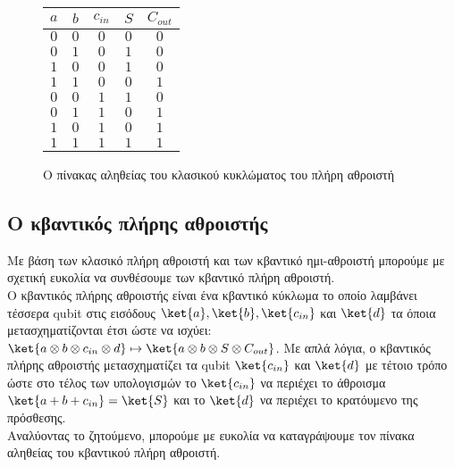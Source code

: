 \begin{figure}[ht]
  \centering
  \begin{tabular}{c c c|c c}
    $a$ & $b$ & $c_{in}$ & $S$ & $C_{out}$ \\
    \hline
    $0$ & $0$ & $0$ & $0$ & $0$ \\
    $0$ & $1$ & $0$ & $1$ & $0$ \\
    $1$ & $0$ & $0$ & $1$ & $0$ \\
    $1$ & $1$ & $0$ & $0$ & $1$ \\
    $0$ & $0$ & $1$ & $1$ & $0$ \\
    $0$ & $1$ & $1$ & $0$ & $1$ \\
    $1$ & $0$ & $1$ & $0$ & $1$ \\
    $1$ & $1$ & $1$ & $1$ & $1$ \\
  \end{tabular}
  \label{fig:11}
  \caption{Ο πίνακας αληθείας του κλασικού κυκλώματος του πλήρη αθροιστή}
\end{figure}

\subsection{Ο κβαντικός πλήρης αθροιστής}

Με βάση των κλασικό πλήρη αθροιστή και των κβαντικό ημι-αθροιστή
μπορούμε με σχετική ευκολία να συνθέσουμε των κβαντικό πλήρη
αθροιστή.\\

Ο κβαντικός πλήρης αθροιστής είναι ένα κβαντικό κύκλωμα το οποίο
λαμβάνει τέσσερα qubit στις εισόδους $\ket{a}, \ket{b}, \ket{c_{in}}$
και $\ket{d}$ τα όποια μετασχηματίζονται έτσι ώστε να ισχύει:
$\ket{a \otimes b \otimes c_{in} \otimes d} \mapsto \ket{a \otimes b \otimes S \otimes C_{out}}$.
Με απλά λόγια, ο κβαντικός πλήρης αθροιστής μετασχηματίζει τα qubit 
$\ket{c_{in}}$ και $\ket{d}$ με τέτοιο τρόπο ώστε στο τέλος των υπολογισμών
το $\ket{c_{in}}$ να περιέχει το άθροισμα $\ket{a+b+c_{in}} = \ket{S}$ και το $\ket{d}$ να περιέχει το κρατόυμενο
της πρόσθεσης.\\

Αναλύοντας το ζητούμενο, μπορούμε με ευκολία να καταγράψουμε
τον πίνακα αληθείας του κβαντικού πλήρη αθροιστή.

